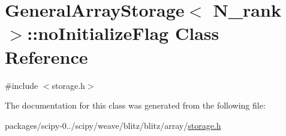 \hypertarget{classGeneralArrayStorage_1_1noInitializeFlag}{}\section{General\+Array\+Storage$<$ N\+\_\+rank $>$\+:\+:no\+Initialize\+Flag Class Reference}
\label{classGeneralArrayStorage_1_1noInitializeFlag}


{\ttfamily \#include $<$storage.\+h$>$}



The documentation for this class was generated from the following file\+:\begin{DoxyCompactItemize}
\item 
packages/scipy-\/0../scipy/weave/blitz/blitz/array/\hyperlink{storage_8h}{storage.\+h}\end{DoxyCompactItemize}
